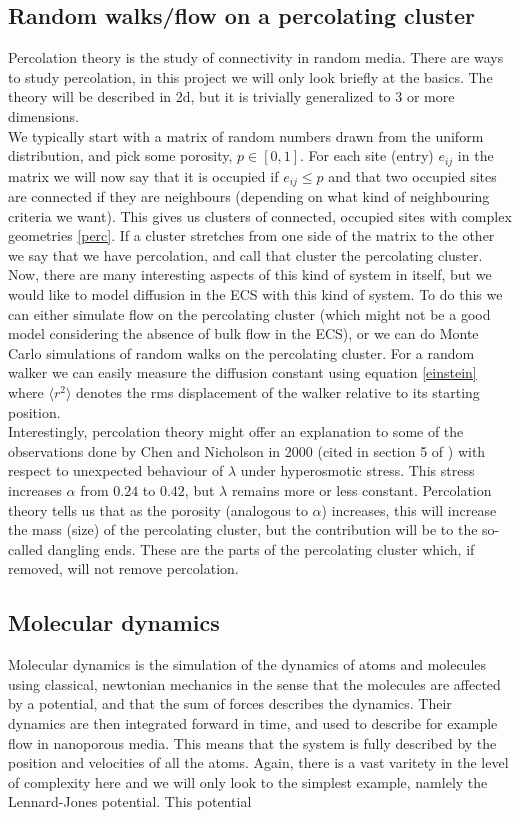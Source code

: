 \documentclass[a4paper,english, 12pt, twoside]{article}
\begin{document}
\subsection{Random walks/flow on a percolating cluster}
Percolation theory is the study of connectivity in random media. There are ways to study percolation, in this project we will only look briefly at the basics. The theory will be described in 2d, but it is trivially generalized to 3 or more dimensions.\\
We typically start with a matrix of random numbers drawn from the uniform distribution, and pick some porosity, $p\in[0,1]$. 
For each site (entry) $e_{ij}$ in the matrix we will now say that it is occupied if $e_{ij} \leq p$ and that two occupied sites are connected if they are neighbours (depending on what kind of neighbouring criteria we want). 
This gives us clusters of connected, occupied sites with complex geometries \ref{perc}. 
If a cluster stretches from one side of the matrix to the other we say that we have percolation, and call that cluster the percolating cluster. 
Now, there are many interesting aspects of this kind of system in itself, but we would like to model diffusion in the ECS with this kind of system. 
To do this we can either simulate flow on the percolating cluster (which might not be a good model considering the absence of bulk flow in the ECS), or we can do Monte Carlo simulations of random walks on the percolating cluster. 
For a random walker we can easily measure the diffusion constant using equation \ref{einstein} where $\langle r^2\rangle$ denotes the rms displacement of the walker relative to its starting position. \\
Interestingly, percolation theory might offer an explanation to some of the observations done by Chen and Nicholson in 2000 (cited in section 5 of \cite{hrabetova2004contribution}) with respect to unexpected behaviour of $\lambda$ under hyperosmotic stress. 
This stress increases $\alpha$ from $0.24$ to $0.42$, but $\lambda$ remains more or less constant. 
Percolation theory tells us that as the porosity (analogous to $\alpha$) increases, this will increase the mass (size) of the percolating cluster, but the contribution will be to the so-called dangling ends. These are the parts of the percolating cluster which, if removed, will not remove percolation.

\subsection{Molecular dynamics}\label{MD}
Molecular dynamics is the simulation of the dynamics of atoms and molecules using classical, newtonian mechanics in the sense that the molecules are affected by a potential, and that the sum of forces describes the dynamics. 
Their dynamics are then integrated forward in time, and used to describe for example flow in nanoporous media. This means that the system is fully described by the position and velocities of all the atoms. 
Again, there is a vast varitety in the level of complexity here and we will only look to the simplest example, namlely the Lennard-Jones potential. 
This potential 
\end{document}
